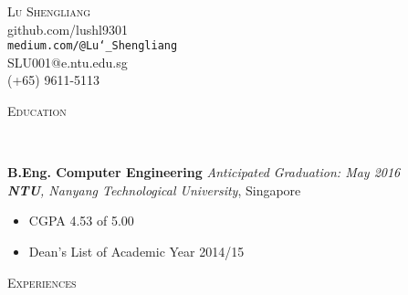 \documentclass[a4paper, 12pt]{article}
\newenvironment{changemargin}[2]{%
  \begin{list}{}{%
      \setlength{\topsep}{0pt}%
      \setlength{\leftmargin}{#1}%
      \setlength{\rightmargin}{#2}%
      \setlength{\listparindent}{\parindent}%
      \setlength{\itemindent}{\parindent}%
      \setlength{\parsep}{\parskip}%
    }%
  \item[]}{\end{list}
}
\newcommand{\lineover}{
  \begin{changemargin}{-0.05in}{-0.05in}
    \vspace*{-8pt}
    \hrulefill \\
    \vspace*{-2pt}
  \end{changemargin}
}
\newcommand{\header}[1]{
  \begin{changemargin}{-0.5in}{-0.5in}
    \scshape{#1}\\
    \lineover
  \end{changemargin}
}
\newcommand{\contact}[5]{
  \begin{changemargin}{-0.5in}{-0.5in}
    \begin{center}
      {\Large \scshape {#1}}\\ \smallskip
      {#2}\\ \smallskip
      {#3}\\ \smallskip
      {#4}\\ \smallskip
      {#5}   \smallskip
    \end{center}
  \end{changemargin}
}
\newenvironment{body}
{
\vspace*{-16pt}
\begin{changemargin}{-0.25in}{-0.5in}
}	
{
\end{changemargin}
}
\begin{document}
\contact{Lu Shengliang}{github.com/lushl9301}{\texttt{medium.com/@Lu\char`_Shengliang}}{SLU001@e.ntu.edu.sg}{(+65) 9611-5113}





\header{Education}

\begin{body}
  \vspace{14pt}
  \textbf{B.Eng. Computer Engineering} \hfill \emph{Anticipated Graduation: May 2016} \\
  \emph{\textbf{NTU}, Nanyang Technological University}, Singapore\\
  \begin{itemize} \itemsep -0pt  \small
  \item CGPA 4.53 of 5.00
  \item Dean's List of Academic Year 2014/15
  \end{itemize} 
\end{body}


\smallskip
\medskip
\header{Experiences}
\end{document}
